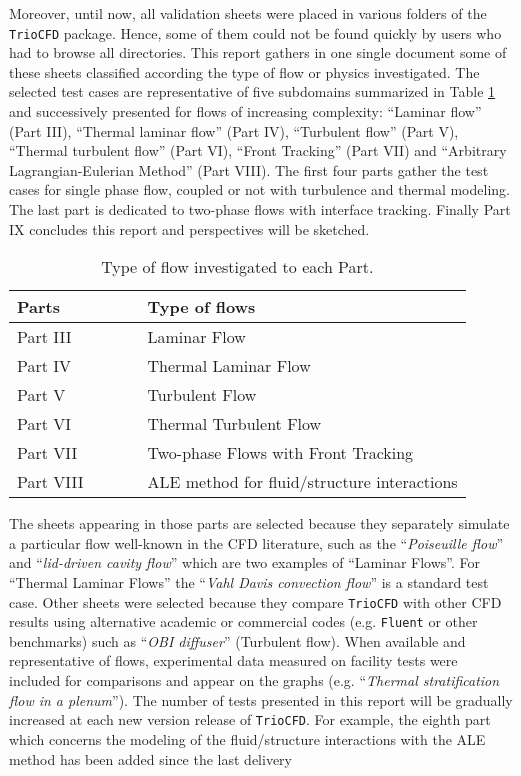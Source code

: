 Moreover, until now, all validation sheets were placed in various
folders of the \texttt{TrioCFD} package. Hence, some of them could not
be found quickly by users who had to browse all directories. This
report gathers in one single document some of these sheets classified according
the type of flow or physics investigated. The selected
test cases are representative of five subdomains summarized in Table
\ref{tab:Type-of-flows} and successively presented for flows
of increasing complexity: \textquotedblleft Laminar flow\textquotedblright{}
(Part III), \textquotedblleft Thermal laminar flow\textquotedblright{}
(Part IV), \textquotedblleft Turbulent flow\textquotedblright{} (Part
V), \textquotedblleft Thermal turbulent flow\textquotedblright{} (Part
VI), \textquotedblleft Front Tracking\textquotedblright{} (Part
VII) and \textquotedblleft Arbitrary Lagrangian-Eulerian Method\textquotedblright{} (Part VIII).
The first four parts gather the test cases for single phase flow,
coupled or not with turbulence and thermal modeling. The
last part is dedicated to two-phase flows with interface tracking.
Finally Part IX concludes this report and perspectives will be sketched.
\newpage
\vspace{2cm}
\begin{table}[H]
\begin{centering}
\begin{tabular}{lll}
\hline 
\textbf{Parts} & $\qquad$ & \textbf{Type of flows}\tabularnewline
\hline 
Part III &  & Laminar Flow\tabularnewline
Part IV &  & Thermal Laminar Flow\tabularnewline
Part V &  & Turbulent Flow\tabularnewline
Part VI &  & Thermal Turbulent Flow\tabularnewline
Part VII &  & Two-phase Flows with Front Tracking\tabularnewline
Part VIII &  & ALE method for fluid/structure interactions\tabularnewline
\hline 
\end{tabular}
\par\end{centering}
\caption{\label{tab:Type-of-flows}Type of flow investigated to each Part.}
\end{table}

The sheets appearing in those parts are selected because they separately
simulate a particular flow well-known in the CFD literature,
such as the ``\emph{Poiseuille flow}'' and ``\emph{lid-driven cavity
flow}'' which are two examples of ``Laminar Flows''. For ``Thermal
Laminar Flows'' the ``\emph{Vahl Davis convection flow}'' is a
standard test case. Other sheets were selected because they compare
\texttt{TrioCFD} with other CFD results using alternative academic
or commercial codes (e.g. \texttt{Fluent} or other benchmarks) such
as ``\emph{OBI diffuser}'' (Turbulent flow). When available and
representative of flows, experimental data measured on facility tests
were included for comparisons and appear on the graphs (e.g. ``\emph{Thermal
stratification flow in a plenum}''). The number of tests presented in this
report will be gradually increased at each new version release of \texttt{TrioCFD}.
For example, the eighth part which concerns the modeling of the fluid/structure
interactions with the ALE method has been added since the last delivery\medskip\newline


